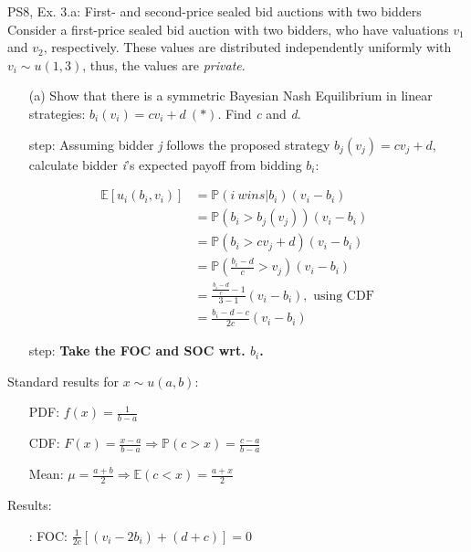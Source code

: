 \begin{frame}{PS8, Ex. 3.a: First- and second-price sealed bid auctions with two bidders}
    Consider a first-price sealed bid auction with two bidders, who have valuations $v_1$ and $v_2$, respectively. These values are distributed independently uniformly with $v_i\sim u(1,3)$, thus, the values are \textit{private}.
    \vspace{-4pt}
    \begin{itemize}
      \item[(a)] Show that there is a symmetric Bayesian Nash Equilibrium in linear strategies: $b_i(v_i) = cv_i + d\ (*)$. Find \textit{c} and \textit{d}.
    \end{itemize}
    \vspace{-8pt}
    \begin{multicols}{2}
      \begin{itemize}
        \item[\nth{1} step:] Assuming bidder \textit{j} follows the proposed strategy $b_j(v_j) = cv_j + d$, calculate bidder \textit{i}'s expected payoff from bidding $b_i$:
      \end{itemize}
      \vspace{-4pt}
      \begin{align*}
        \mathbb{E}[u_i(b_i,v_i)]&=\mathbb{P}(i\ wins|b_i)(v_i-b_i)\\
                                &=\mathbb{P}(b_i>b_j(v_j))(v_i-b_i)\\
                                &=\mathbb{P}(b_i>cv_j+d)(v_i-b_i)\\
                                &=\mathbb{P}\left(\frac{b_i-d}{c}>v_j\right)(v_i-b_i)\\
                                &=\frac{\frac{b_i-d}{c}-1}{3-1}(v_i-b_i),\text{ using CDF}\\
                                &=\frac{b_i-d-c}{2c}(v_i-b_i)
      \end{align*}
      \vspace{-10pt}
      \begin{itemize}
        \item[\nth{2} step:] \textbf{Take the FOC and SOC wrt. $b_i$.}
      \end{itemize}
      \vfill\null\columnbreak
      Standard results for $x\sim u(a, b):$
      \vspace{-6pt}
      \begin{enumerate}
        \item[PDF:] $f(x)=\frac{1}{b-a}$
        \item[CDF:] $F(x)=\frac{x-a}{b-a}\Rightarrow\mathbb{P}(c>x)=\frac{c-a}{b-a}$
        \item[Mean:] $\mu=\frac{a+b}{2}\Rightarrow\mathbb{E}(c<x)=\frac{a+x}{2}$
      \end{enumerate}
      \vspace{-6pt}
      Results:
      \vspace{-6pt}
      \begin{itemize}
        \item[\nth{2}:] FOC: $\frac{1}{2c}[(v_i-2b_i)+(d+c)]=0$
      \end{itemize}
      \vfill\null
    \end{multicols}
\end{frame}
